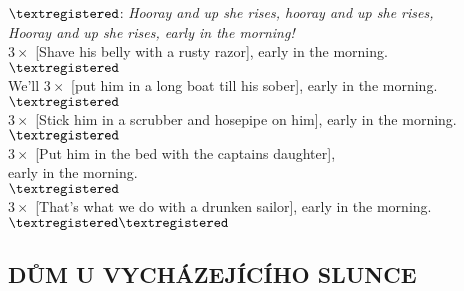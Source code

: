 \documentclass[a4paper, 10pt]{book}
\begin{document}
\begin{LARGE}
$\textregistered$:
\emph{Hooray and up she rises, hooray and up she rises,\\
Hooray and up she rises, early in the morning!}\\

$3\times$ [Shave his belly with a rusty razor], early in the morning.\\

$\textregistered$\\

We'll $3\times$ [put him in a long boat till his sober], early in the morning.\\

$\textregistered$\\

$3\times$ [Stick him in a scrubber and hosepipe on him], early in the morning.\\

$\textregistered$\\

$3\times$ [Put him in the bed with the captains daughter],\\
early in the morning.\\

$\textregistered$\\

$3\times$ [That’s what we do with a drunken sailor], early in the morning.\\

$\textregistered \textregistered$

\newpage


\begin{flushleft}
	\section*{\Huge DŮM U VYCHÁZEJÍCÍHO SLUNCE}
\end{flushleft}


\end{LARGE}
\end{document}
